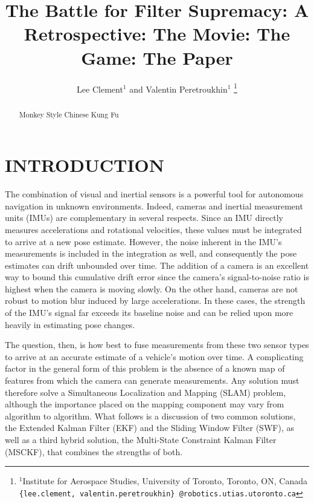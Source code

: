 \documentclass[letterpaper, 10 pt, conference]{ieeeconf}  %
\title{\LARGE \bf
The Battle for Filter Supremacy: A Retrospective: The Movie: The Game: The Paper
}
\author{Lee Clement$^{1}$ and Valentin Peretroukhin$^{1}$%
\thanks{$^{1}$Institute for Aerospace Studies,
        University of Toronto, Toronto, ON, Canada
        {\tt \{lee.clement, valentin.peretroukhin\} @robotics.utias.utoronto.ca}
        }%
}
\begin{document}
\maketitle
\thispagestyle{empty}
\pagestyle{empty}


\begin{abstract}

Monkey Style Chinese Kung Fu

\end{abstract}


\section{INTRODUCTION} \label{sec:introduction}

The combination of visual and inertial sensors is a powerful tool for autonomous navigation in unknown environments.
Indeed, cameras and inertial measurement units (IMUs) are complementary in several respects.
Since an IMU directly measures accelerations and rotational velocities, these values must be integrated to arrive at a new pose estimate.
However, the noise inherent in the IMU's measurements is included in the integration as well, and consequently the pose estimates can drift unbounded over time.
The addition of a camera is an excellent way to bound this cumulative drift error since the camera's signal-to-noise ratio is highest when the camera is moving slowly.
On the other hand, cameras are not robust to motion blur induced by large accelerations.
In these cases, the strength of the IMU's signal far exceeds its baseline noise and can be relied upon more heavily in estimating pose changes.

The question, then, is how best to fuse measurements from these two sensor types to arrive at an accurate estimate of a vehicle's motion over time.
A complicating factor in the general form of this problem is the absence of a known map of features from which the camera can generate measurements.
Any solution must therefore solve a Simultaneous Localization and Mapping (SLAM) problem, although the importance placed on the mapping component may vary from algorithm to algorithm.
What follows is a discussion of two common solutions, the Extended Kalman Filter (EKF) and the Sliding Window Filter (SWF), as well as a third hybrid solution, the Multi-State Constraint Kalman Filter (MSCKF), that combines the strengths of both.
\end{document}
